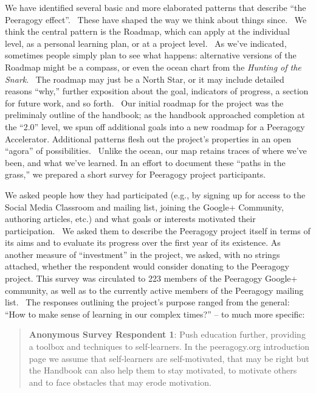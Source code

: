 We have identified several basic and more elaborated patterns that
describe ``the Peeragogy effect''.~ These have shaped the way we think
about things since.~ We think the central pattern is the Roadmap, which
can apply at the individual level, as a personal learning plan, or at a
project level.~ As we've indicated, sometimes people simply plan to see
what happens: alternative versions of the Roadmap might be a compass, or
even the ocean chart from the \emph{Hunting of the Snark}.~ The roadmap
may just be a North Star, or it may include detailed reasons ``why,''
further exposition about the goal, indicators of progress, a section for
future work, and so forth.~ Our initial roadmap for the project was the
preliminaly outline of the handbook; as the handbook approached
completion at the ``2.0'' level, we spun off additional goals into a new
roadmap for a Peeragogy Accelerator. Additional patterns flesh out the
project's properties in an open ``agora'' of possibilities.~ Unlike the
ocean, our map retains traces of where we've been, and what we've
learned. In an effort to document these ``paths in the grass,'' we
prepared a short survey for Peeragogy project participants.

We asked people how they had participated (e.g., by signing up for
access to the Social Media Classroom and mailing list, joining the
Google+ Community, authoring articles, etc.) and what goals or interests
motivated their participation.~ We asked them to describe the Peeragogy
project itself in terms of its aims and to evaluate its progress over
the first year of its existence. As another measure of ``investment'' in
the project, we asked, with no strings attached, whether the respondent
would consider donating to the Peeragogy project. This survey was
circulated to 223 members of the Peeragogy Google+ community, as well as
to the currently active members of the Peeragogy mailing list.~ The
responses outlining the project's purpose ranged from the general: ``How
to make sense of learning in our complex times?'' -- to much more
specific:

\begin{quote}
\textbf{Anonymous Survey Respondent 1}: Push education further,
providing a toolbox and techniques to self-learners. In the
peeragogy.org introduction page we assume that self-learners are
self-motivated, that may be right but the Handbook can also help them to
stay motivated, to motivate others and to face obstacles that may erode
motivation.
\end{quote}

